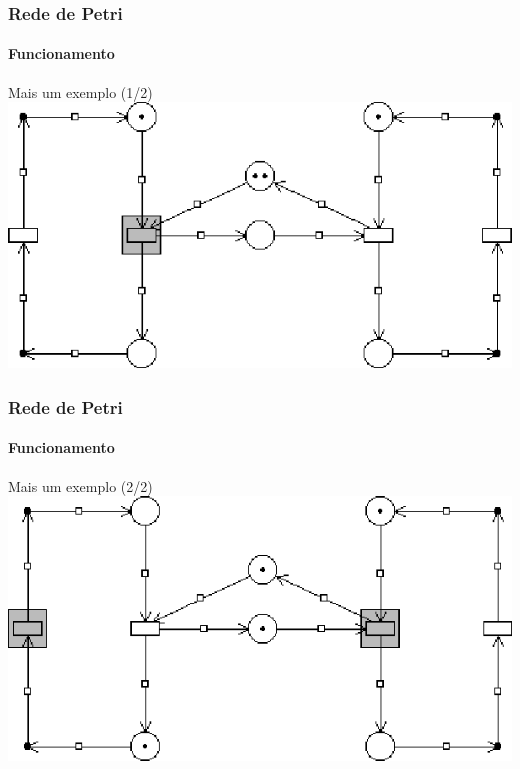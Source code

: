 \begin{frame}
	\frametitle{Rede de Petri}
	\framesubtitle{Funcionamento}
	
	\begin{block:ie}{Mais um exemplo (1/2)}
		\centering
		\includegraphics[width=.85\textwidth]{software-engineering/petri-net/petrinet-execution-example1-1}
	\end{block:ie}
\end{frame}

\begin{frame}
	\frametitle{Rede de Petri}
	\framesubtitle{Funcionamento}
	
	\begin{block:ie}{Mais um exemplo (2/2)}
		\centering
		\includegraphics[width=.85\textwidth]{software-engineering/petri-net/petrinet-execution-example1-2}
	\end{block:ie}
\end{frame}


